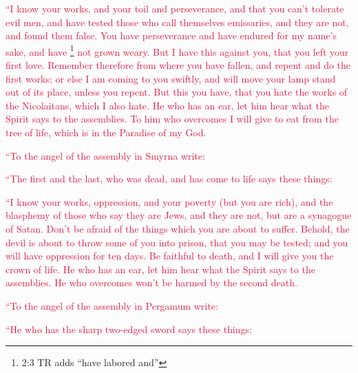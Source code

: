\myverse{}\textcolor{crimson}{“I know your works, and your toil and perseverance, and that
	you can’t tolerate evil men, and have tested those who call themselves emissaries, and they are not, and
	found them false.
}
\myverse{}\textcolor{crimson}{You have perseverance and have endured for my name’s sake, and have
}\footnote{2:3 TR adds “have labored and”}
\textcolor{crimson}{not grown weary.
}
\myverse{}\textcolor{crimson}{But I have this against you, that you left your first love.
}
\myverse{}\textcolor{crimson}{Remember therefore from where you have fallen, and repent and do the first
	works; or else I am coming to you swiftly, and will move your lamp stand out of its place, unless you
	repent.
}
\myverse{}\textcolor{crimson}{But this you have, that you hate the works of the Nicolaitans, which I also
	hate.
}
\myverse{}\textcolor{crimson}{He who has an ear, let him hear what the Spirit says to the assemblies.
	To him who overcomes I will give to eat from the tree of life, which is in the Paradise of my God.}

\myverse{}\textcolor{crimson}{“To the angel of the assembly in Smyrna write:}

\textcolor{crimson}{“The first and the last, who was dead, and has come to life says these things:}

\myverse{}\textcolor{crimson}{“I know your works, oppression, and your poverty (but you are
	rich), and the blasphemy of those who say they are Jews, and they are not, but are a synagogue of Satan.
}
\myverse{}\textcolor{crimson}{Don’t be afraid of the things which you are about to suffer. Behold, the
	devil is about to throw some of you into prison, that you may be tested; and you will have oppression
	for ten days. Be faithful to death, and I will give you the crown of life.
}
\myverse{}\textcolor{crimson}{He who has an ear, let him hear what the Spirit says to the assemblies.
	He who overcomes won’t be harmed by the second death.}

\myverse{}\textcolor{crimson}{“To the angel of the assembly in Pergamum write:}

\textcolor{crimson}{“He who has the sharp two-edged sword says these things:}

